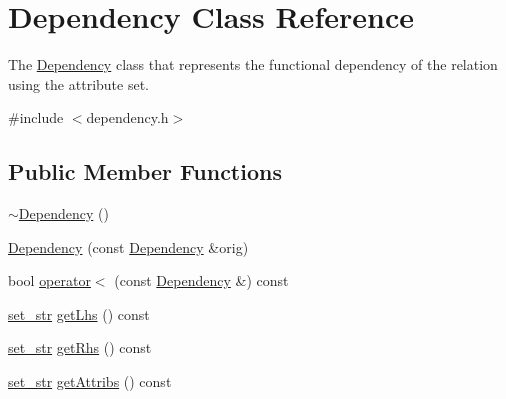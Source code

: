 \hypertarget{class_dependency}{}\section{Dependency Class Reference}
\label{class_dependency}


The \hyperlink{class_dependency}{Dependency} class that represents the functional dependency of the relation using the attribute set.  




{\ttfamily \#include $<$dependency.\+h$>$}

\subsection*{Public Member Functions}
\begin{DoxyCompactItemize}
\item 
\hyperlink{class_dependency_a11db83a63b7dbff6878e621c3ea05303}{$\sim$\+Dependency} ()
\item 
\hyperlink{class_dependency_a626387359a1896a2e39fe27884ed4ce5}{Dependency} (const \hyperlink{class_dependency}{Dependency} \&orig)
\item 
bool \hyperlink{class_dependency_a78821e0db3f417a24b728d38e7d8ff47}{operator$<$} (const \hyperlink{class_dependency}{Dependency} \&) const 
\item 
\hyperlink{typedef_8h_aa234bdb39b1698c1d4955072cfb3195f}{set\+\_\+str} \hyperlink{class_dependency_a75b5b75d47219e1731105d865abcedcf}{get\+Lhs} () const 
\item 
\hyperlink{typedef_8h_aa234bdb39b1698c1d4955072cfb3195f}{set\+\_\+str} \hyperlink{class_dependency_ae14affe4b2559610e997a507d9f331dc}{get\+Rhs} () const 
\item 
\hyperlink{typedef_8h_aa234bdb39b1698c1d4955072cfb3195f}{set\+\_\+str} \hyperlink{class_dependency_aa6638880326df07b4715028f6e8e1eff}{get\+Attribs} () const 
\end{DoxyCompactItemize}

